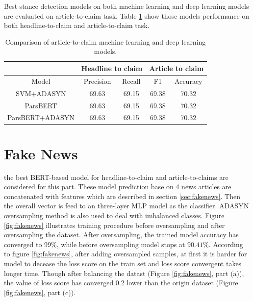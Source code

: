 Best stance detection models on both machine learning and deep learning models are evaluated on article-to-claim task. Table \ref{tbl:allstance} show those models performance on both headline-to-claim and article-to-claim task. 

\begin{table}[t]
	\centering
	\small
	\caption{Comparison of article-to-claim machine learning and deep learning models.}
	\def\arraystretch{1.3}%
	\setlength{\extrarowheight}{5pt}%
	\begin{tabular}{|c|c|c|c|c|}
		\hline
		{} & \multicolumn{2}{c|}{Headline to claim} &  \multicolumn{2}{c|}{Article to claim}\\
		\hline 
		{Model} & {Precision} & {Recall} & {F1} & {Accuracy}\\
		\hline	\hline
		{SVM+ADASYN} & {69.63} & {69.15} & {69.38} & {70.32}\\
		\hline
		{ParsBERT} & {69.63} & {69.15} & {69.38} & {70.32}\\
		\hline
		{ParsBERT+ADASYN} & {69.63} & {69.15} & {69.38} & {70.32}\\
		\hline
	\end{tabular}
	\label{tbl:allstance}
\end{table}

\section{Fake News}
the best BERT-based model for headline-to-claim and article-to-claims are considered for this part. These model prediction base on 4 news articles are concatenated with features which are described in section \ref{sec:fakenews}. Then the overall vector is feed to an three-layer MLP model as the classifier. ADASYN oversampling method is also used to deal with imbalanced classes. Figure \ref{fig:fakenews} illustrates training procedure before oversampling and after oversampling the dataset. After oversampling, the trained model accuracy has converged to 99\%, while before oversampling model stops at $90.41\%$. According to figure \ref{fig:fakenews}, after adding oversampled samples, at first it is harder for model to decease the loss score on the train set and loss score convergent takes longer time. Though after balancing the datast (Figure \ref{fig:fakenews}, part (a)), the value of loss score has converged 0.2 lower than the origin dataset (Figure \ref{fig:fakenews}, part (c)).

